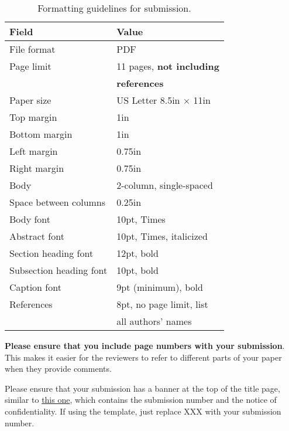 \documentclass{sig-alternate}
\begin{document}
\begin{scriptsize}
\begin{table}[h!]
  \centering
  \begin{tabular}{|l|l|}
    \hline
    \textbf{Field} & \textbf{Value}\\
    \hline
    \hline
    File format & PDF \\
    \hline
    Page limit & 11 pages, {\bf not including}\\
               & {\bf references}\\
    \hline
    Paper size & US Letter 8.5in $\times$ 11in\\
    \hline
    Top margin & 1in\\
    \hline
    Bottom margin & 1in\\
    \hline
    Left margin & 0.75in\\
    \hline
    Right margin & 0.75in\\
    \hline
    Body & 2-column, single-spaced\\
    \hline
    Space between columns & 0.25in\\
    \hline
    Body font & 10pt, Times\\
    \hline
    Abstract font & 10pt, Times, italicized\\
    \hline
    Section heading font & 12pt, bold\\
    \hline
    Subsection heading font & 10pt, bold\\
    \hline
    Caption font & 9pt (minimum), bold\\
    \hline
    References & 8pt, no page limit, list \\
               & all authors' names\\
    \hline
  \end{tabular}
  \caption{Formatting guidelines for submission.}
  \label{table:formatting}
\end{table}
\end{scriptsize}

\textbf{Please ensure that you include page numbers with your
submission}. This makes it easier for the reviewers to refer to different
parts of your paper when they provide comments.

Please ensure that your submission has a banner at the top of the
title page, similar to
\href{http://www.microarch.org/micro50/samplepaper.pdf}{this one},
which contains the submission number and the notice of
confidentiality.  If using the template, just replace XXX with your
submission number.
\end{document}
